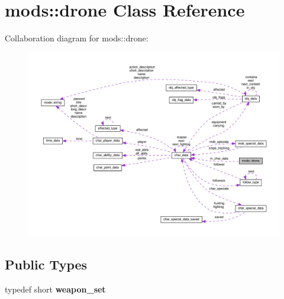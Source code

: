 \hypertarget{classmods_1_1drone}{}\section{mods\+:\+:drone Class Reference}
\label{classmods_1_1drone}


Collaboration diagram for mods\+:\+:drone\+:
\nopagebreak
\begin{figure}[H]
\begin{center}
\leavevmode
\includegraphics[width=350pt]{classmods_1_1drone__coll__graph}
\end{center}
\end{figure}
\subsection*{Public Types}
\begin{DoxyCompactItemize}
\item 
\mbox{\label{classmods_1_1drone_a3dec2f5e974bdc9c97196e2458c445d1}} 
typedef short {\bfseries weapon\+\_\+set}
\end{DoxyCompactItemize}
